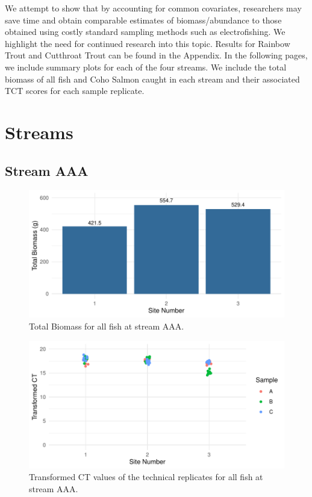 \vspace{5mm}

We attempt to show that by accounting for common covariates, researchers may save time and obtain comparable estimates of biomass/abundance to those obtained using costly standard sampling methods such as electrofishing.  We highlight the need for continued research into this topic. Results for Rainbow Trout and Cutthroat Trout can be found in the Appendix. In the following pages, we include summary plots for each of the four streams. We include the total biomass of all fish and Coho Salmon caught in each stream and their associated TCT scores for each sample replicate.


\newpage

\section{Streams}

\subsection{Stream AAA}


\begin{figure}[H]
\centering
\includegraphics{Chapter5Images/AAA_Ef_new.pdf}
\caption{ Total Biomass for all fish at stream AAA.}
\label{fig:AAA_ef}
\end{figure}



\begin{figure}[H]
\centering
\includegraphics{Chapter5Images/AAA_ef_tct.pdf}
\caption{ Transformed CT values of the technical replicates for all fish at stream AAA.}
\label{fig:AAA_ef2}
\end{figure}






